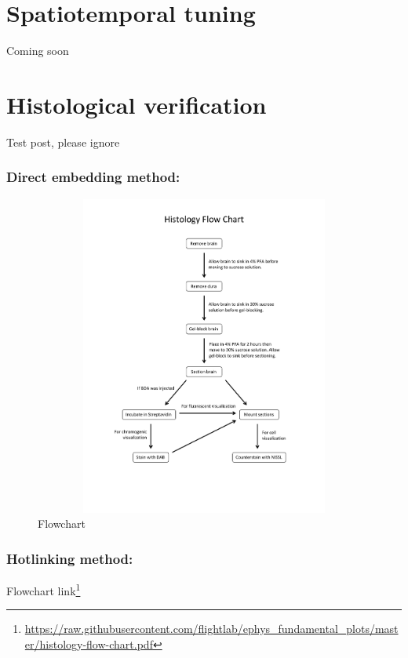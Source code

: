 \documentclass[
]{book}
\DeclareRobustCommand{\href}[2]{#2\footnote{\url{#1}}}
\begin{document}
\hypertarget{spatiotemporal-tuning}{%
\chapter{Spatiotemporal tuning}\label{spatiotemporal-tuning}}

Coming soon

\hypertarget{histological-verification}{%
\chapter{Histological verification}\label{histological-verification}}

Test post, please ignore

\hypertarget{direct-embedding-method}{%
\subsection{Direct embedding method:}\label{direct-embedding-method}}

\begin{figure}
\centering
\includegraphics[width=1\textwidth,height=4.16667in]{./histology-flow-chart.pdf}
\caption{Flowchart}
\end{figure}

\hypertarget{hotlinking-method}{%
\subsection{Hotlinking method:}\label{hotlinking-method}}

\href{https://raw.githubusercontent.com/flightlab/ephys_fundamental_plots/master/histology-flow-chart.pdf}{Flowchart link}

  
\end{document}
